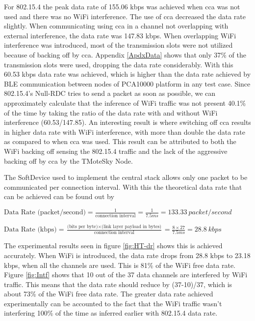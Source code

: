 For 802.15.4 the peak data rate of 155.06 kbps was achieved when \gls{cca} was not used and there was no WiFi interference. The use of \gls{cca} decreased the data rate slightly. When communicating using \gls{cca} in a channel not overlapping with external interference, the data rate was 147.83 kbps. When overlapping WiFi interference was introduced, most of the transmission slots were not utilized because of backing off by \gls{cca}. Appendix \ref{ApdxData} shows that only 37\% of the transmission slots were used, dropping the data rate considerably. With this 60.53 kbps data rate was achieved, which is higher than the data rate achieved by BLE communication between nodes of PCA10000 platform in any test case. Since 802.15.4's Null-RDC tries to send a packet as soon as possible, we can approximately calculate that the inference of WiFi traffic was not present 40.1\% of the time by taking the ratio of the data rate with and without WiFi interference (60.53/147.85). An interesting result is where switching off \gls{cca} results in higher data rate with WiFi interference, with more than double the data rate as compared to when \gls{cca} was used. This result can be attributed to both the WiFi backing off sensing the 802.15.4 traffic and the lack of the aggressive backing off by \gls{cca} by the TMoteSky Node. %

The SoftDevice used to implement the central stack allows only one packet to be communicated per connection interval. With this the theoretical data rate that can be achieved can be found out by

\vspace{5pt}
$\mbox{Data Rate  (packet/second)}=\frac{1}{\mbox{connection interval}}=\frac{1}{7.5ms}=133.33\:packet/second$

\vspace{15 pt}
$\mbox{Data Rate (kbps)}=\frac{\mbox{(bits per byte)}\times\mbox{(link layer payload in bytes)}}{\mbox{connection interval}}=\frac{8\times27}{7.5ms}=28.8\:kbps$
\vspace{10 pt}

The experimental results seen in figure \ref{fig:HT-dr} shows this is achieved accurately. When WiFi is introduced, the data rate drops from 28.8 kbps to 23.18 kbps, when all the channels are used. This is 81\% of the WiFi free data rate. Figure \ref{fig:Intf} shows that 10 out of the 37 data channels are interfered by WiFi traffic. This means that the data rate should reduce by (37-10)/37, which is about 73\% of the WiFi free data rate. The greater data rate achieved experimentally can be accounted to the fact that the WiFi traffic wasn't interfering 100\% of the time as inferred earlier with 802.15.4 data rate. 

